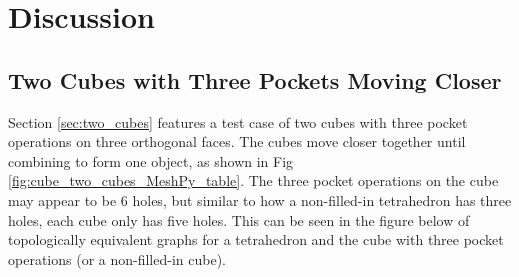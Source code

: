 \documentclass[ma]{uncgdissertationexp}
\theoremstyle{plain}
\theoremstyle{definition}
\theoremstyle{remark}
\begin{document}
\chapter{Discussion}
\label{chap:discussion}
\section{Two Cubes with Three Pockets Moving Closer}
\label{sec:two_cubes_discussion}
\par Section \ref{sec:two_cubes} features a test case of two cubes with three pocket operations on three orthogonal faces. The cubes move closer together until combining to form one object, as shown in Fig \ref{fig:cube_two_cubes_MeshPy_table}. The three pocket operations on the cube may appear to be 6 holes, but similar to how a non-filled-in tetrahedron has three holes, each cube only has five holes. This can be seen in the figure below of topologically equivalent graphs for a tetrahedron and the cube with three pocket operations (or a non-filled-in cube).
\end{document}
